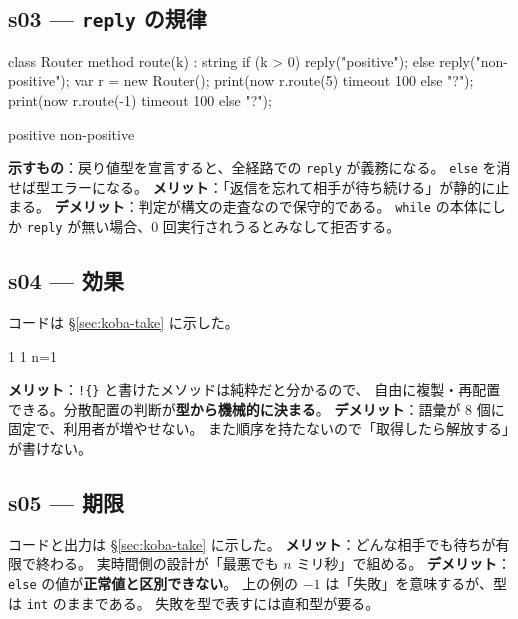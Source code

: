 \documentclass[11pt,a4paper]{ltjsarticle}
\theoremstyle{definition}
\theoremstyle{remark}
\begin{document}
\subsection{s03 --- \texttt{reply} の規律}
\begin{aipl}
class Router {
  method route(k) : string {
    if (k > 0) { reply("positive"); } else { reply("non-positive"); }
  }
}
var r = new Router();
print(now r.route(5)  timeout 100 else "?");
print(now r.route(-1) timeout 100 else "?");
\end{aipl}
\begin{term}
positive
non-positive
\end{term}
\textbf{示すもの}：戻り値型を宣言すると、全経路での \texttt{reply} が義務になる。
\texttt{else} を消せば型エラーになる。
\textbf{メリット}：「返信を忘れて相手が待ち続ける」が静的に止まる。
\textbf{デメリット}：判定が構文の走査なので保守的である。
\texttt{while} の本体にしか \texttt{reply} が無い場合、0 回実行されうるとみなして拒否する。

\subsection{s04 --- 効果}
コードは \S\ref{sec:koba-take} に示した。
\begin{term}
1
1
n=1
\end{term}
\textbf{メリット}：\texttt{!\{\}} と書けたメソッドは純粋だと分かるので、
自由に複製・再配置できる。分散配置の判断が\textbf{型から機械的に決まる}。
\textbf{デメリット}：語彙が 8 個に固定で、利用者が増やせない。
また順序を持たないので「取得したら解放する」が書けない。

\subsection{s05 --- 期限}
コードと出力は \S\ref{sec:koba-take} に示した。
\textbf{メリット}：どんな相手でも待ちが有限で終わる。
実時間側の設計が「最悪でも $n$ ミリ秒」で組める。
\textbf{デメリット}：\texttt{else} の値が\textbf{正常値と区別できない}。
上の例の $-1$ は「失敗」を意味するが、型は \texttt{int} のままである。
失敗を型で表すには直和型が要る。
\end{document}
